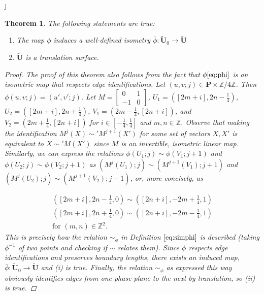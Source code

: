 j\documentclass[]{article}
\newtheorem{thm}{Theorem}[subsection]
\begin{document}
\begin{thm}{The following statements are true:}
\begin{enumerate}[label=(\roman*)]
\item The map $\phi$ induces a well-defined isometry $\bar{\phi}:\tilde{\mathbf{U}}_0 \rightarrow \tilde{\mathbf{U}}$
\item $\tilde{\mathbf{U}}$ is a translation surface.
\end{enumerate}
\begin{proof}
The proof of this theorem also follows from the fact that $\phi \eqref{eq:phi}$ is an isometric map that respects edge identifications. Let $(u,v;j)\in\mathbf{P}\times\mathbb{Z}/4\mathbb{Z}$. Then $\phi(u,v;j)=(u',v';j)$. Let $M=\left[\begin{matrix}
0 & 1\\
-1 & 0
\end{matrix}\right]$, $U_1=([2m+i],2n-\frac{1}{4})$, $U_2=([2m+i],2n+\frac{1}{4})$, $V_1=(2m-\frac{1}{4},[2n+i])$, and $V_2=(2m+\frac{1}{4},[2n+i])$ for $i\in[-\frac{1}{4},\frac{1}{4}]$ and $m,n\in\mathbb{Z}$. Observe that making the identification $M^{j}(X)\sim' M^{j+1}(X')$ for some set of vectors $X,X'$ is equivalent to $X\sim' M(X')$ since $M$ is an invertible, isometric linear map. Similarly, we can express the relations $\phi(U_1;j)\sim\phi(V_1;j+1)$ and $\phi(U_2;j)\sim\phi(V_2;j+1)$ as $(M^{j}(U_1);j)\sim (M^{j+1}(V_1);j+1)$ and $(M^{j}(U_2);j)\sim (M^{j+1}(V_2);j+1)$, or, more concisely, as

\begin{multline*}
([2m+i], 2n-\frac{1}{4},0)\sim([2n+i],-2m+\frac{1}{4},1)\\
([2m+i], 2n+\frac{1}{4},0)\sim([2n+i],-2m-\frac{1}{4},1)\\
\text{for } (m,n) \in \mathbb{Z}^{2}.
\end{multline*}
This is precisely how the relation $\sim_{\phi}$ in Definition $\eqref{eq:simphi}$ is described (taking $\phi^{-1}$ of two points and checking if $\sim$ relates them).  Since $\phi$ respects edge identifications and preserves boundary lengths, there exists an induced map, $\bar{\phi}:\tilde{\mathbf{U}}_0 \rightarrow \tilde{\mathbf{U}}$ and \emph{(i)} is true. Finally, the relation $\sim_{\phi}$ as expressed this way obviously identifies edges from one phase plane to the next by translation, so \emph{(ii)} is true.
\end{proof}
\end{thm}

\end{document}
